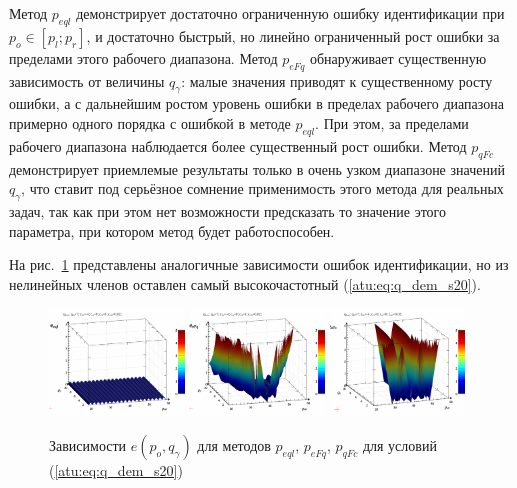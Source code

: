 Метод $p_{eql}$ демонстрирует достаточно ограниченную ошибку идентификации
при $p_o \in [p_l; p_r]$, и достаточно быстрый, но линейно ограниченный рост ошибки
за пределами этого рабочего диапазона.
Метод $p_{eFq}$ обнаруживает существенную зависимость от величины $q_\gamma$:
малые значения %
приводят к существенному росту ошибки, а с дальнейшим ростом
уровень ошибки в пределах рабочего диапазона примерно
одного порядка с ошибкой в методе $p_{eql}$.
При этом, за пределами рабочего диапазона наблюдается более существенный рост ошибки.
Метод $p_{qFc}$ демонстрирует приемлемые результаты
только в очень узком диапазоне значений $q_\gamma$,
что ставит под серьёзное сомнение применимость этого метода
для реальных задач, так как при этом нет возможности предсказать
то значение этого параметра, при котором метод будет работоспособен.


На рис.~\ref{atu:f:qsl_pe_po_qg_s20} представлены аналогичные зависимости ошибок идентификации,
но из нелинейных членов оставлен самый высокочастотный (\ref{atu:eq:q_dem_s20}).

\begin{figure}[htb!]
  \centerline{
    \includegraphics[width=0.32\textwidth]{p/qls_pe-p_po_qg_eql_s20.png}
    \hfill
    \includegraphics[width=0.32\textwidth]{p/qls_pe-p_po_qg_eFq_s20.png}
    \hfill
    \includegraphics[width=0.32\textwidth]{p/qls_pe-p_po_qg_eFc_s20.png}
  }
  \caption{Зависимости $e(p_o,q_\gamma)$ для методов $p_{eql}$, $p_{eFq}$, $p_{qFc}$ для условий (\ref{atu:eq:q_dem_s20})}
  \label{atu:f:qsl_pe_po_qg_s20}
\end{figure}

